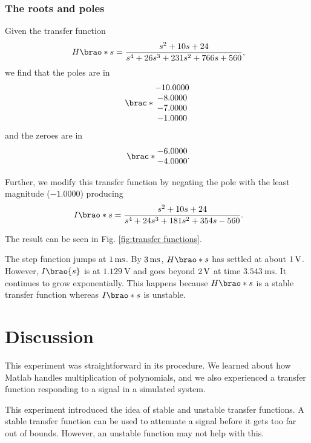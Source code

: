 \documentclass[12pt]{article}
\DeclarePairedDelimiter\brao()%
\DeclarePairedDelimiter\brac[]%
\begin{document}
\subsubsection{The roots and poles}

Given the transfer function 
\[
    H\brao*s = \frac{s^2 + 10s + 24}{s^4 + 26s^3 + 231s^2 + 766s + 560}\rlap,
\]
we find that the poles are in
\[
    \brac*{
        \begin{matrix}
            -10.0000 \\*
            -8.0000 \\*
            -7.0000 \\*
            -1.0000 \\*
        \end{matrix}
    }
\]
and the zeroes are in
\[
    \brac*{
        \begin{matrix}
            -6.0000 \\*
            -4.0000 \\*
        \end{matrix}
    }\rlap.
\]

Further, we modify this transfer function by negating the pole with the least magnitude ($-1.0000$) producing
\[
    I\brao*s = \frac{s^2 + 10 s + 24}{s^4 + 24 s^3 + 181 s^2 + 354 s - 560}\rlap.
\]

The result can be seen in Fig. \ref{fig:transfer functions}.

The step function jumps at $\SI1{\milli\second}$.
By $\SI3{\milli\second}$, $H\brao*s$ has settled at about $\SI1\volt$.
However, $I\brao{s}$ is at $\SI{1.129}\volt$ and goes beyond $\SI2\volt$ at time $\SI{3.543}{\milli\second}$.
It continues to grow exponentially.
This happens because $H\brao*s$ is a stable transfer function whereas $I\brao*s$ is unstable.

\section{Discussion}

This experiment was straightforward in its procedure.
We learned about how Matlab handles multiplication of polynomials,
and we also experienced a transfer function responding to a signal in a simulated system.

This experiment introduced the idea of stable and unstable transfer functions.
A stable transfer function can be used to attenuate a signal before it gets too far out of bounds.
However, an unstable function may not help with this.
\end{document}
